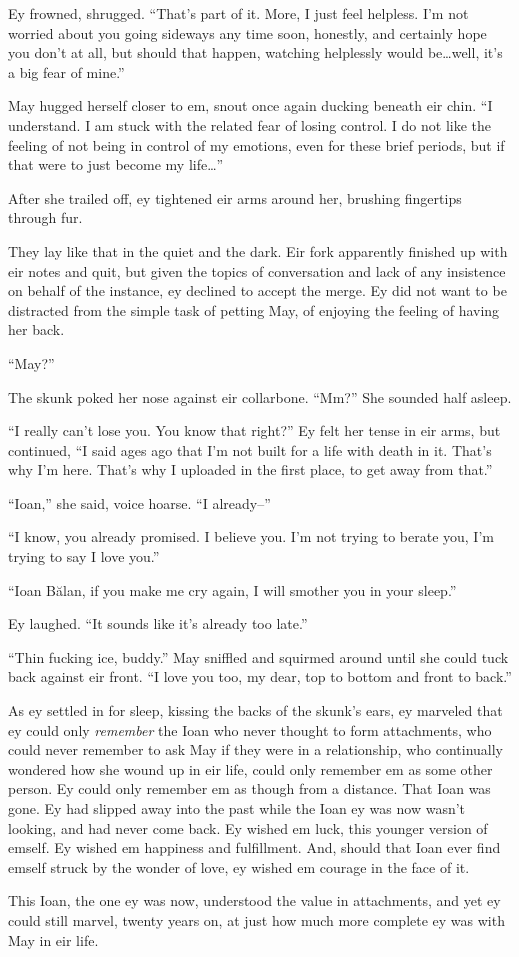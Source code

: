 Ey frowned, shrugged. ``That's part of it. More, I just feel helpless. I'm not worried about you going sideways any time soon, honestly, and certainly hope you don't at all, but should that happen, watching helplessly would be\ldots well, it's a big fear of mine.''

May hugged herself closer to em, snout once again ducking beneath eir chin. ``I understand. I am stuck with the related fear of losing control. I do not like the feeling of not being in control of my emotions, even for these brief periods, but if that were to just become my life\ldots{}''

After she trailed off, ey tightened eir arms around her, brushing fingertips through fur.

They lay like that in the quiet and the dark. Eir fork apparently finished up with eir notes and quit, but given the topics of conversation and lack of any insistence on behalf of the instance, ey declined to accept the merge. Ey did not want to be distracted from the simple task of petting May, of enjoying the feeling of having her back.

``May?''

The skunk poked her nose against eir collarbone. ``Mm?'' She sounded half asleep.

``I really can't lose you. You know that right?'' Ey felt her tense in eir arms, but continued, ``I said ages ago that I'm not built for a life with death in it. That's why I'm here. That's why I uploaded in the first place, to get away from that.''

``Ioan,'' she said, voice hoarse. ``I already--''

``I know, you already promised. I believe you. I'm not trying to berate you, I'm trying to say I love you.''

``Ioan Bălan, if you make me cry again, I will smother you in your sleep.''

Ey laughed. ``It sounds like it's already too late.''

``Thin fucking ice, buddy.'' May sniffled and squirmed around until she could tuck back against eir front. ``I love you too, my dear, top to bottom and front to back.''

As ey settled in for sleep, kissing the backs of the skunk's ears, ey marveled that ey could only \emph{remember} the Ioan who never thought to form attachments, who could never remember to ask May if they were in a relationship, who continually wondered how she wound up in eir life, could only remember em as some other person. Ey could only remember em as though from a distance. That Ioan was gone. Ey had slipped away into the past while the Ioan ey was now wasn't looking, and had never come back. Ey wished em luck, this younger version of emself. Ey wished em happiness and fulfillment. And, should that Ioan ever find emself struck by the wonder of love, ey wished em courage in the face of it.

This Ioan, the one ey was now, understood the value in attachments, and yet ey could still marvel, twenty years on, at just how much more complete ey was with May in eir life.
